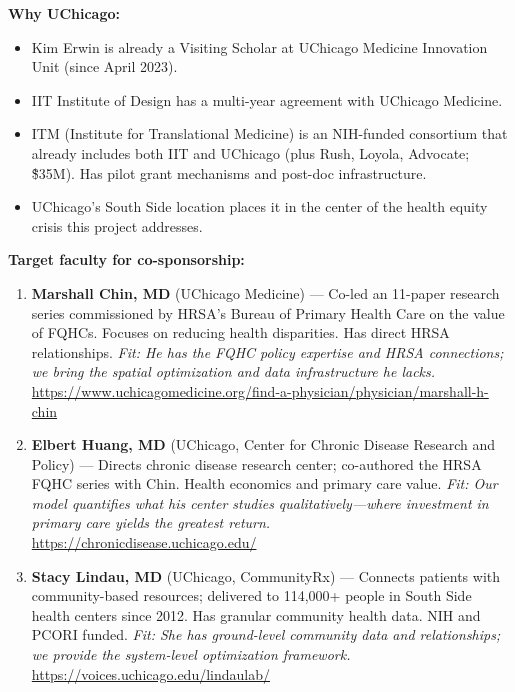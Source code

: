 \documentclass[11pt]{article}
\begin{document}
\textbf{Why UChicago:}
\begin{itemize}[nosep]
    \item Kim Erwin is already a Visiting Scholar at UChicago Medicine Innovation Unit (since April 2023).
    \item IIT Institute of Design has a multi-year agreement with UChicago Medicine.
    \item ITM (Institute for Translational Medicine) is an NIH-funded consortium that already includes both IIT and UChicago (plus Rush, Loyola, Advocate; \~\$35M). Has pilot grant mechanisms and post-doc infrastructure.
    \item UChicago's South Side location places it in the center of the health equity crisis this project addresses.
\end{itemize}

\textbf{Target faculty for co-sponsorship:}
\begin{enumerate}[nosep]
    \item \textbf{Marshall Chin, MD} (UChicago Medicine) --- Co-led an 11-paper research series commissioned by HRSA's Bureau of Primary Health Care on the value of FQHCs. Focuses on reducing health disparities. Has direct HRSA relationships. \textit{Fit: He has the FQHC policy expertise and HRSA connections; we bring the spatial optimization and data infrastructure he lacks.} \\
    \url{https://www.uchicagomedicine.org/find-a-physician/physician/marshall-h-chin}

    \item \textbf{Elbert Huang, MD} (UChicago, Center for Chronic Disease Research and Policy) --- Directs chronic disease research center; co-authored the HRSA FQHC series with Chin. Health economics and primary care value. \textit{Fit: Our model quantifies what his center studies qualitatively---where investment in primary care yields the greatest return.} \\
    \url{https://chronicdisease.uchicago.edu/}

    \item \textbf{Stacy Lindau, MD} (UChicago, CommunityRx) --- Connects patients with community-based resources; delivered to 114,000+ people in South Side health centers since 2012. Has granular community health data. NIH and PCORI funded. \textit{Fit: She has ground-level community data and relationships; we provide the system-level optimization framework.} \\
    \url{https://voices.uchicago.edu/lindaulab/}
\end{enumerate}
\end{document}
